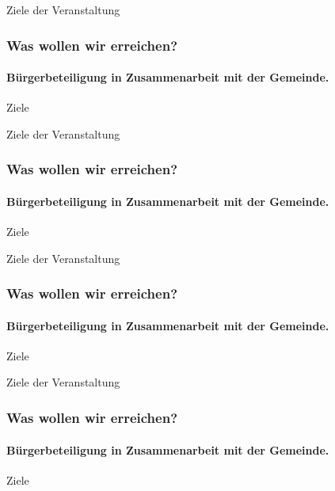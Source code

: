 \begin{frame}{Ziele der Veranstaltung}
	\frametitle{Was wollen wir erreichen?} 
	\framesubtitle{Bürgerbeteiligung in Zusammenarbeit mit der Gemeinde.}
	Ziele
\end{frame}

\begin{frame}{Ziele der Veranstaltung}
	\frametitle{Was wollen wir erreichen?} 
	\framesubtitle{Bürgerbeteiligung in Zusammenarbeit mit der Gemeinde.}
	Ziele
\end{frame}

\begin{frame}{Ziele der Veranstaltung}
	\frametitle{Was wollen wir erreichen?} 
	\framesubtitle{Bürgerbeteiligung in Zusammenarbeit mit der Gemeinde.}
	Ziele
\end{frame}

\begin{frame}{Ziele der Veranstaltung}
	\frametitle{Was wollen wir erreichen?} 
	\framesubtitle{Bürgerbeteiligung in Zusammenarbeit mit der Gemeinde.}
	Ziele
\end{frame}